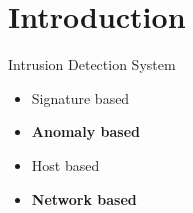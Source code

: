 \section{Introduction}

\begin{frame}
Intrusion Detection System
\begin{itemize}
	\item Signature based
	\item \textbf{Anomaly based}
	\item Host based
	\item \textbf{Network based}
\end{itemize}
\end{frame}